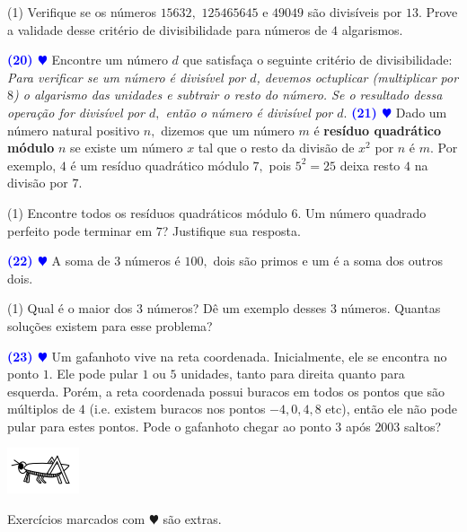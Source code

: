 \documentclass[12pt, a4paper]{article}
\newcommand{\negrito}[1]{\mbox{\boldmath{$#1$}}}
\begin{document}
\begin{tasks}[counter-format={(tsk[a])},label-width=3.6ex, label-format = {\bfseries}, column-sep = {0pt}](1)
\task[\textcolor{Floresta}{$\negrito{(a)} $}] Verifique se os números $15632,$ $125465645$ e $49049$ são divisíveis por $13$.
\task[\textcolor{Floresta}{$\negrito{(b)} $}] Prove a validade desse critério de divisibilidade para números de $4$ algarismos.
\end{tasks}
\textcolor{blue}{\bf(20) $\varheart$} Encontre um número $d$ que satisfaça o seguinte critério de divisibilidade:
\textit{Para verificar se um número é divisível por $d$, devemos octuplicar (multiplicar por $8$) o algarismo das unidades e subtrair o resto do número. Se o resultado dessa operação for divisível por $d,$ então o número é divisível por $d.$}%
\newline\newline
\textcolor{blue}{\bf(21) $\varheart$} Dado um número natural positivo $n,$ dizemos que um número $m$ é \textbf{resíduo quadrático módulo} $n$ se existe um número $x$ tal que o resto da divisão de $x^2$ por $n$ é $m.$ Por exemplo, $4$ é um resíduo quadrático módulo $7,$ pois $5^2 = 25$ deixa resto $4$ na divisão por $7.$
\begin{tasks}[counter-format={(tsk[a])},label-width=3.6ex, label-format = {\bfseries}, column-sep = {0pt}](1)
\task[\textcolor{Floresta}{$\negrito{(a)} $}] Encontre todos os resíduos quadráticos módulo $6.$
\task[\textcolor{Floresta}{$\negrito{(b)} $}] Um número quadrado perfeito pode terminar em $7$? Justifique sua resposta.
\end{tasks}
\textcolor{blue}{\bf(22) $\varheart$} A soma de $3$ números é $100,$ dois são primos e um é a soma dos outros dois.
\begin{tasks}[counter-format={(tsk[a])},label-width=3.6ex, label-format = {\bfseries}, column-sep = {0pt}](1)
\task[\textcolor{Floresta}{$\negrito{(a)} $}] Qual é o maior dos 3 números?
\task[\textcolor{Floresta}{$\negrito{(b)} $}] Dê um exemplo desses 3 números.
\task[\textcolor{Floresta}{$\negrito{(c)} $}] Quantas soluções existem para esse problema?
\end{tasks}
\textcolor{blue}{\bf(23) $\varheart$} Um gafanhoto vive na reta coordenada. Inicialmente, ele se encontra no ponto $1.$ Ele pode pular $1$ ou $5$ unidades, tanto para direita quanto para esquerda. Porém, a reta coordenada possui buracos em todos os pontos que são múltiplos de $4$ (i.e. existem buracos nos pontos $-4, 0, 4, 8$ etc), então ele não pode pular para estes pontos. Pode o gafanhoto chegar ao ponto $3$ após $2003$ saltos?
\begin{center}
\includegraphics[scale=1.5]{Listas do PIC/gafanhoto.png}
\end{center}

Exercícios marcados com $\varheart$ são extras.
\end{document}
